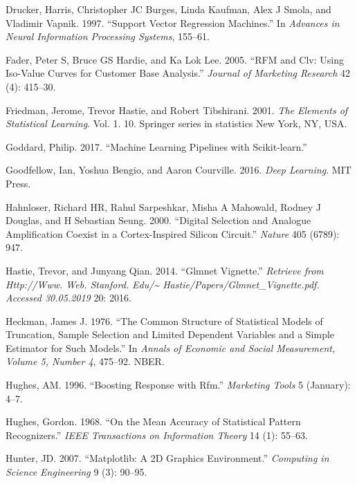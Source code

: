 \documentclass[
  11pt,
  a4paper,
  DIV=12,captions=tableheading,oneside,titlepage]{scrbook}
\begin{document}
\leavevmode\hypertarget{ref-drucker1997support}{}%
Drucker, Harris, Christopher JC Burges, Linda Kaufman, Alex J Smola, and Vladimir Vapnik. 1997. ``Support Vector Regression Machines.'' In \emph{Advances in Neural Information Processing Systems}, 155--61.

\leavevmode\hypertarget{ref-fader2005rfmclv}{}%
Fader, Peter S, Bruce GS Hardie, and Ka Lok Lee. 2005. ``RFM and Clv: Using Iso-Value Curves for Customer Base Analysis.'' \emph{Journal of Marketing Research} 42 (4): 415--30.

\leavevmode\hypertarget{ref-friedman2001elements}{}%
Friedman, Jerome, Trevor Hastie, and Robert Tibshirani. 2001. \emph{The Elements of Statistical Learning}. Vol. 1. 10. Springer series in statistics New York, NY, USA.

\leavevmode\hypertarget{ref-goddard2017variance}{}%
Goddard, Philip. 2017. ``Machine Learning Pipelines with Scikit-learn.''

\leavevmode\hypertarget{ref-goodfellow2016deep}{}%
Goodfellow, Ian, Yoshua Bengio, and Aaron Courville. 2016. \emph{Deep Learning}. MIT Press.

\leavevmode\hypertarget{ref-hahnloser2000digital}{}%
Hahnloser, Richard HR, Rahul Sarpeshkar, Misha A Mahowald, Rodney J Douglas, and H Sebastian Seung. 2000. ``Digital Selection and Analogue Amplification Coexist in a Cortex-Inspired Silicon Circuit.'' \emph{Nature} 405 (6789): 947.

\leavevmode\hypertarget{ref-hastie2014glmnet}{}%
Hastie, Trevor, and Junyang Qian. 2014. ``Glmnet Vignette.'' \emph{Retrieve from Http://Www. Web. Stanford. Edu/\textasciitilde{} Hastie/Papers/Glmnet\_Vignette.pdf. Accessed 30.05.2019} 20: 2016.

\leavevmode\hypertarget{ref-heckman1976common}{}%
Heckman, James J. 1976. ``The Common Structure of Statistical Models of Truncation, Sample Selection and Limited Dependent Variables and a Simple Estimator for Such Models.'' In \emph{Annals of Economic and Social Measurement, Volume 5, Number 4}, 475--92. NBER.

\leavevmode\hypertarget{ref-hughes-rfm-boost-response}{}%
Hughes, AM. 1996. ``Boosting Response with Rfm.'' \emph{Marketing Tools} 5 (January): 4--7.

\leavevmode\hypertarget{ref-hughes1968mean}{}%
Hughes, Gordon. 1968. ``On the Mean Accuracy of Statistical Pattern Recognizers.'' \emph{IEEE Transactions on Information Theory} 14 (1): 55--63.

\leavevmode\hypertarget{ref-hunter2007matplotlib}{}%
Hunter, JD. 2007. ``Matplotlib: A 2D Graphics Environment.'' \emph{Computing in Science Engineering} 9 (3): 90--95.
\end{document}
